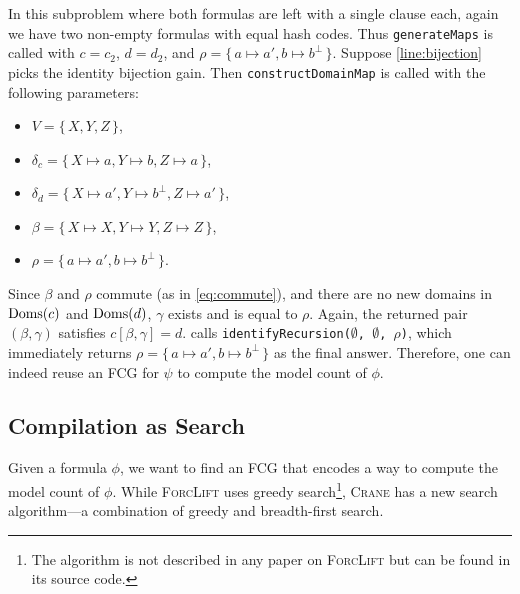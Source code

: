 \begin{example}
  In this subproblem where both formulas are left with a single clause each,
  again we have two non-empty formulas with equal hash codes. Thus
  \texttt{generateMaps} is called with $c = c_2$, $d = d_2$, and
  $\rho = \{\, a \mapsto a', b \mapsto b^\bot \,\}$. Suppose
  \cref{line:bijection} picks the identity bijection gain. Then
  \texttt{constructDomainMap} is called with the following parameters:
  \begin{itemize}
    \item $V = \{\, X, Y, Z \,\}$,
    \item $\delta_c = \{\, X \mapsto a, Y \mapsto b, Z \mapsto a \,\}$,
    \item $\delta_d = \{\, X \mapsto a', Y \mapsto b^\bot, Z \mapsto a' \,\}$,
    \item $\beta = \{\, X \mapsto X, Y \mapsto Y, Z \mapsto Z \,\}$,
    \item $\rho = \{\, a \mapsto a', b \mapsto b^\bot \,\}$.
  \end{itemize}
  Since $\beta$ and $\rho$ commute (as in \cref{eq:commute}), and there are no
  new domains in $\operatorname{Doms}(c)$ and $\operatorname{Doms}(d)$, $\gamma$ exists and is equal to
  $\rho$. Again, the returned pair $(\beta, \gamma)$ satisfies
  $c[\beta, \gamma] = d$.  calls
  \texttt{identifyRecursion($\emptyset$, $\emptyset$, $\rho$)}, which
  immediately returns $\rho = \{\, a \mapsto a', b \mapsto b^\bot \,\}$ as the
  final answer. Therefore, one can indeed reuse an FCG for $\psi$ to compute the
  model count of $\phi$.
\end{example}

\subsection{Compilation as Search}

Given a formula $\phi$, we want to find an FCG that encodes a way to compute the
model count of $\phi$. While \textsc{ForcLift}
\citep{DBLP:conf/ijcai/BroeckTMDR11} uses greedy search\footnote{The algorithm
  is not described in any paper on \textsc{ForcLift} but can be found in its
  source code.}, \textsc{Crane} has a new search algorithm---a combination of
greedy and breadth-first search.

